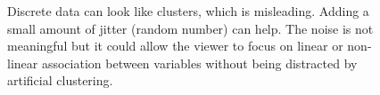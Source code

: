 \documentclass[
  letterpaper,
]{krantz}
\begin{document}
\begin{figure}

\begin{minipage}{0.50\linewidth}



\end{minipage}%
%
\begin{minipage}{0.50\linewidth}



\end{minipage}%

\caption{\label{fig-discrete-data-pdf}Discrete data can look like
clusters, which is misleading. Adding a small amount of jitter (random
number) can help. The noise is not meaningful but it could allow the
viewer to focus on linear or non-linear association between variables
without being distracted by artificial clustering.}

\end{figure}%
\end{document}
